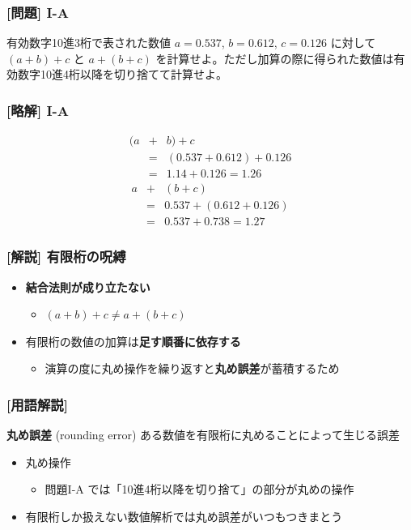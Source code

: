 \documentclass[dvipdfmx,aspectratio=169,20pt]{beamer}
\begin{document}
\begin{frame}
\frametitle{[問題] I-A}

有効数字10進3桁で表された数値 $a=0.537$, $b=0.612$, $c=0.126$ に対して $(a+b)+c$ と $a+(b+c)$ を計算せよ。ただし加算の際に得られた数値は有効数字10進4桁以降を切り捨てて計算せよ。
\end{frame}
\begin{frame}
\frametitle{[略解] I-A}
\vspace{-1cm}
\begin{eqnarray*}
    (a&+&b)+c\\
    &=&(0.537+0.612)+0.126\\
    &=&1.14+0.126=1.26
\end{eqnarray*}
\begin{eqnarray*}
    a&+&(b+c)\\
    &=&0.537+(0.612+0.126)\\
    &=&0.537+0.738=1.27
\end{eqnarray*}
\end{frame}
\begin{frame}
\frametitle{{\large [解説] 有限桁の呪縛}}
\begin{itemize}
    \setlength{\itemsep}{0.5cm}
    \item {\bf 結合法則が成り立たない}
    \begin{itemize}
        \item $(a+b)+c\neq a+(b+c)$
    \end{itemize}
    \item 有限桁の数値の加算は{\bf 足す順番に依存する}
    \begin{itemize}
        \item 演算の度に丸め操作を繰り返すと{\bf 丸め誤差}が蓄積するため
    \end{itemize}
\end{itemize}
\end{frame}
\begin{frame}
\frametitle{{\large [用語解説]}}
\begin{block}{{\bf 丸め誤差} {\small (rounding error)}}
ある数値を有限桁に丸めることによって生じる誤差
\end{block}
\begin{itemize}
    \item 丸め操作
    \begin{itemize}
        \item 問題I-A では「10進4桁以降を切り捨て」の部分が丸めの操作
    \end{itemize}
    \item 有限桁しか扱えない数値解析では丸め誤差がいつもつきまとう
\end{itemize}
\end{frame}
\end{document}
